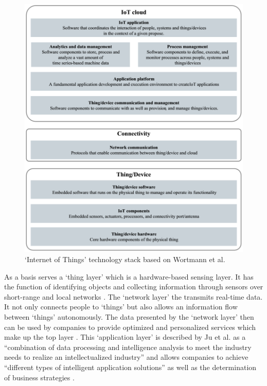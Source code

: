 	\begin{figure}[ht]
	    \begin{center}
	    \includegraphics[scale=0.55]{Talk11/wortmann_stack.png}
	    \end{center}
	    \caption{`Internet of Things' technology stack based on Wortmann et al. \cite{wortmann}}
	    \label{fig:wortmann_stack}
    \end{figure}
	
	As a basis serves a `thing layer' which is a hardware-based sensing layer. It has the function of identifying objects and collecting information through sensors over short-range and local networks \cite{ju}. The `network layer' the transmits real-time data. It not only connects people to `things' but also allows an information flow between `things' autonomously. The data presented by the `network layer' then can be used by companies to provide optimized and personalized services which make up the top layer \cite{ju}. This `application layer' is described by Ju et al. as a ``combination of data processing and intelligence analysis to meet the industry needs to realize an intellectualized industry'' \cite{ju}  and allows companies to achieve ``different types of intelligent application solutions'' as well as the determination of business strategies \cite{ju} .

